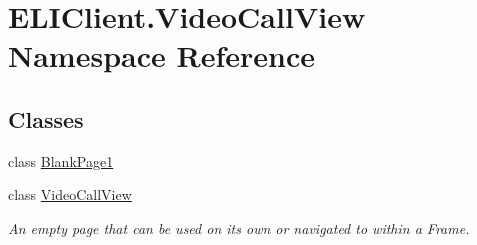 \hypertarget{namespace_e_l_i_client_1_1_video_call_view}{}\section{E\+L\+I\+Client.\+Video\+Call\+View Namespace Reference}
\label{namespace_e_l_i_client_1_1_video_call_view}
\subsection*{Classes}
\begin{DoxyCompactItemize}
\item 
class \hyperlink{class_e_l_i_client_1_1_video_call_view_1_1_blank_page1}{Blank\+Page1}
\item 
class \hyperlink{class_e_l_i_client_1_1_video_call_view_1_1_video_call_view}{Video\+Call\+View}
\begin{DoxyCompactList}\small\item\em An empty page that can be used on its own or navigated to within a Frame. \end{DoxyCompactList}\end{DoxyCompactItemize}
